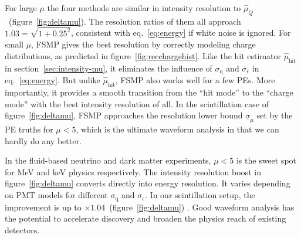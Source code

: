 For large $\mu$ the four methods are similar in intensity resolution to $\hat{\mu}_Q$~(figure~\ref{fig:deltamu}).  The resolution ratios of them all approach $1.03 = \sqrt{1 + 0.25^2}$, consistent with eq.~\eqref{eq:energy} if white noise is ignored.  For small $\mu$, FSMP gives the best resolution by correctly modeling charge distributions, as predicted in figure~\ref{fig:recchargehist}.  Like the hit estimator $\hat{\mu}_\mathrm{hit}$ in section~\ref{sec:intensity-mu}, it eliminates the influence of $\sigma_\mathrm{q}$ and $\sigma_\epsilon$ in eq.~\eqref{eq:energy}.  But unlike $\hat{\mu}_\mathrm{hit}$, FSMP also works well for a few PEs.  More importantly, it provides a smooth transition from the ``hit mode'' to the ``charge mode'' with the best intensity resolution of all.   In the scintillation case of figure~\ref{fig:deltamu}, FSMP approaches the resolution lower bound $\underline{\sigma}_\mu$ set by the PE truths for $\mu < 5$, which is the ultimate waveform analysis in that we can hardly do any better.

In the fluid-based neutrino and dark matter experiments, $\mu < 5$ is the sweet spot for \si{MeV} and \si{keV} physics respectively.  The intensity resolution boost in figure~\ref{fig:deltamu} converts directly into energy resolution.  It varies depending on PMT models for different $\sigma_\mathrm{q}$ and $\sigma_\epsilon$.  In our scintillation setup, the improvement is up to $\times 1.04$~(figure~\ref{fig:deltamu}) . Good waveform analysis has the potential to accelerate discovery and broaden the physics reach of existing detectors. 